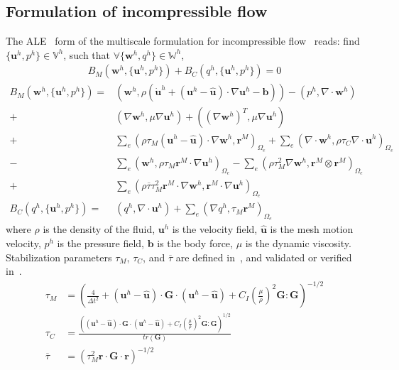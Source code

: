 \documentclass[preprint,12pt,sort&compress]{elsarticle}
\theoremstyle{definition}%
\begin{document}
\subsection{Formulation of incompressible flow}
The ALE~\cite{bazilevs2012ale} form of the multiscale formulation for incompressible flow~\cite{Bazilevs07b} reads: find $\{{\bm{u}}^h, p^h\}\in\mathbb{V}^h$, such that $\forall\{\bm{w}^h, q^h\}\in\mathbb{W}^h$,
\begin{align}
  B_M\left(\bm{w}^h, \{\bm{u}^h, p^h\}\right) + B_C\left(q^h, \{\bm{u}^h, p^h\}\right) = 0
\end{align}
\begin{align}
  \nonumber B_M\left(\bm{w}^h, \{\bm{u}^h, p^h\}\right)
  =&\left(\bm{w}^h, \rho(\dot{\bm{u}}^h+(\bm{u}^h-\hat{\bm{u}})\cdot\nabla\bm{u}^h-\bm{b})\right)
  -\left(p^h, \nabla\cdot\bm{w}^h\right)\\
  \nonumber +&\left(\nabla\bm{w}^h, \mu\nabla\bm{u}^h\right)
  + \left( (\nabla\bm{w}^h)^T, \mu\nabla\bm{u}^h\right)  \\
  \nonumber +&\sum_e \left(\rho\tau_M (\bm{u}^h-\hat{\bm{u}})\cdot\nabla \bm{w}^h, \bm{r}^M\right)_{\Omega_e}
  +\sum_e\left(\nabla\cdot\bm{w}^h, \rho \tau_C \nabla\cdot\bm{u}^h\right)_{\Omega_e}\\
  \nonumber -&\sum_e\left(\bm{w}^h, \rho\tau_M\bm{r}^M\cdot\nabla\bm{u}^h\right)_{\Omega_e}
  -\sum_e\left(\rho\tau_M^2\nabla\bm{w}^h,\bm{r}^M\otimes\bm{r}^M \right)_{\Omega_e}\\
  +&\sum_e\left(\rho\overline{\tau}\tau_M^2 \bm{r}^M\cdot\nabla\bm{w}^h, \bm{r}^M\cdot\nabla\bm{u}^h\right)_{\Omega_e}\\
  B_C\left(q^h, \{\bm{u}^h, p^h\}\right)=&\left(q^h, \nabla\cdot\bm{u}^h\right)
  +\sum_e\left(\nabla q^h,\tau_M\bm{r}^M\right)_{\Omega_e}
\end{align}
where $\rho$ is the density of the fluid, $\bm{u}^h$ is the velocity field, $\hat{\bm{u}}$ is the mesh motion velocity, $p^h$ is the pressure field,
$\bm{b}$ is the body force, $\mu$ is the dynamic viscosity. Stabilization parameters $\tau_M$, $\tau_C$, and $\overline{\tau}$ are defined in~\cite{Brooks82a, Tezduyar91c, hughes1989new}, 
and validated or verified in~\cite{du2023modeling, zhao2023computational, zhao2022enriched, zhu2021mixed, zhao2020variational,Kamensky15ch, Kamensky2017, hsu2012wind, Akkerman11a, Akkerman11b}.
\begin{align}
  \tau_M&=\left(\frac{4}{\Delta t^2}+(\bm{u}^h-\hat{\bm{u}})\cdot\bm{G}\cdot(\bm{u}^h-\hat{\bm{u}})+C_I(\frac{\mu}{\rho})^2 \bm{G}:\bm{G}\right)^{-1/2}\\
  \tau_C&=\frac{\left((\bm{u}^h-\hat{\bm{u}})\cdot\bm{G}\cdot(\bm{u}^h-\hat{\bm{u}})+C_I(\frac{\mu}{\rho})^2 \bm{G}:\bm{G}\right)^{1/2}}{tr(\bm{G})}\\
  \overline{\tau}&=\left(\tau_M^2\bm{r}\cdot\bm{G}\cdot\bm{r}\right)^{-1/2}
\end{align}
\end{document}
